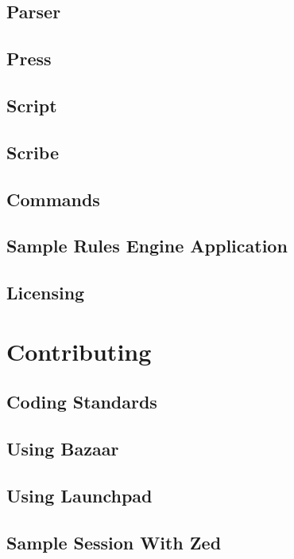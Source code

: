 \section{Parser}


\section{Press}


\section{Script}


\section{Scribe}


\section{Commands}


\section{Sample Rules Engine Application}


\section{Licensing}



\chapter{Contributing}
\label{chapter:Contributing}



\section{Coding Standards}


\section{Using Bazaar}


\section{Using Launchpad}


\section{Sample Session With Zed}

